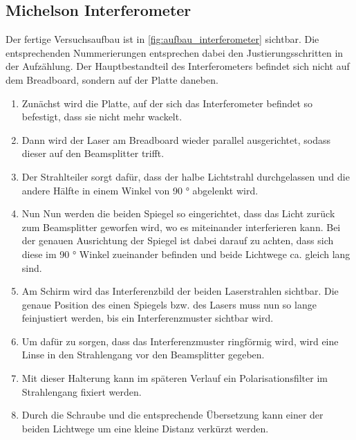 \documentclass[12pt,english,ngerman]{scrartcl}
\begin{document}
\subsection{Michelson Interferometer}

Der fertige Versuchsaufbau ist in \autoref{fig:aufbau_interferometer} sichtbar. Die entsprechenden Nummerierungen entsprechen dabei den 
Justierungsschritten in der Aufzählung. Der Hauptbestandteil des Interferometers befindet sich nicht auf dem Breadboard,
sondern auf der Platte daneben.

\begin{enumerate}
    \item Zunächst wird die Platte, auf der sich das Interferometer befindet so befestigt, dass sie nicht mehr wackelt.
    \item Dann wird der Laser am Breadboard wieder parallel ausgerichtet, sodass dieser auf den Beamsplitter trifft.
    \item Der Strahlteiler sorgt dafür, dass der halbe Lichtstrahl durchgelassen und die andere Hälfte in einem Winkel
    von 90 ° abgelenkt wird.
    \item Nun Nun werden die beiden Spiegel so eingerichtet, dass das Licht zurück zum Beamsplitter geworfen wird, wo es 
    miteinander interferieren kann. Bei der genauen Ausrichtung der Spiegel ist dabei darauf zu achten, dass sich diese 
    im 90 ° Winkel zueinander befinden und beide Lichtwege ca. gleich lang sind.
    \item Am Schirm wird das Interferenzbild der beiden Laserstrahlen sichtbar. Die genaue Position des einen Spiegels 
    bzw. des Lasers muss nun so lange feinjustiert werden, bis ein Interferenzmuster sichtbar wird.
    \item Um dafür zu sorgen, dass das Interferenzmuster ringförmig wird, wird eine Linse in den Strahlengang vor den 
    Beamsplitter gegeben.
    \item Mit dieser Halterung kann im späteren Verlauf ein Polarisationsfilter im Strahlengang fixiert werden.
    \item Durch die Schraube und die entsprechende Übersetzung kann einer der beiden Lichtwege um eine kleine Distanz 
    verkürzt werden.
\end{enumerate}
\end{document}
